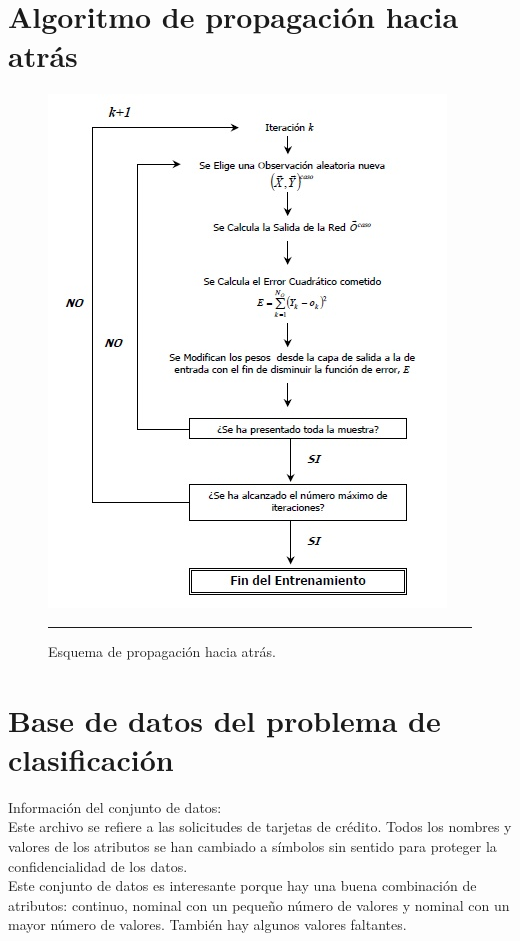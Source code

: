 \documentclass[11pt,titlepage]{report}
\begin{document}

\clearpage
\section{Algoritmo de propagación hacia atrás}
\begin{figure}[h]
	\centering
	\includegraphics[scale=1.1]{Pic/diagramaentren}
	\caption{Esquema de propagación hacia atrás.\cite{Int10}}
	\label{09}
	\hrule
\end{figure}
\clearpage
\section{Base de datos del problema de clasificación}
Información del conjunto de datos:\\

Este archivo se refiere a las solicitudes de tarjetas de crédito. Todos los nombres y valores de los atributos se han cambiado a símbolos sin sentido para proteger la confidencialidad de los datos.\\
Este conjunto de datos es interesante porque hay una buena combinación de atributos: continuo, nominal con un pequeño número de valores y nominal con un mayor número de valores. También hay algunos valores faltantes.\\
\end{document}
